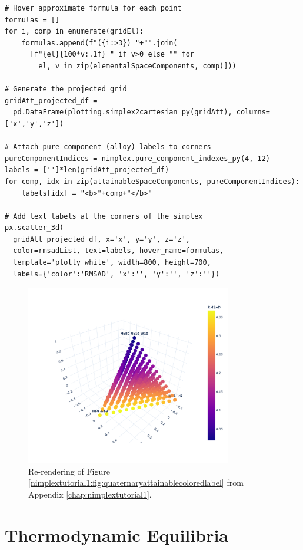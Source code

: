\begin{verbatim}
# Hover approximate formula for each point
formulas = []
for i, comp in enumerate(gridEl):
    formulas.append(f"({i:>3}) "+"".join(
      [f"{el}{100*v:.1f} " if v>0 else "" for 
        el, v in zip(elementalSpaceComponents, comp)]))

# Generate the projected grid
gridAtt_projected_df = 
  pd.DataFrame(plotting.simplex2cartesian_py(gridAtt), columns=['x','y','z'])

# Attach pure component (alloy) labels to corners
pureComponentIndices = nimplex.pure_component_indexes_py(4, 12)
labels = ['']*len(gridAtt_projected_df)
for comp, idx in zip(attainableSpaceComponents, pureComponentIndices):
    labels[idx] = "<b>"+comp+"</b>"

# Add text labels at the corners of the simplex
px.scatter_3d(
  gridAtt_projected_df, x='x', y='y', z='z', 
  color=rmsadList, text=labels, hover_name=formulas,
  template='plotly_white', width=800, height=700, 
  labels={'color':'RMSAD', 'x':'', 'y':'', 'z':''})
\end{verbatim}

\begin{figure}[H]
    \centering
    \includegraphics[width=0.8\textwidth]{nimplextutorial2/02.AdditiveManufacturingPathPlanning_11_0.pdf}
    \caption{Re-rendering of Figure \ref{nimplextutorial1:fig:quaternaryattainablecoloredlabel} from Appendix \ref{chap:nimplextutorial1}.}
    \label{nimplextutorial2:fig:propertyfield}
\end{figure}

\section{Thermodynamic Equilibria}\label{nimplextutorial2:thermodynamic-equilibria}

